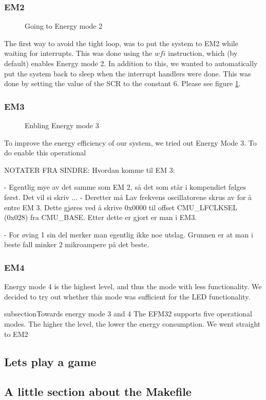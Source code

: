 	\subsubsection{EM2}
	
	\begin{figure}[h]
		
		\caption{Going to Energy mode 2}
		\label{code:wfi_scr}
	\end{figure}
	
	The first way to avoid the tight loop, was to put the system to EM2 while waiting for interrupts. This was done using the $wfi$ instruction, which (by default) enables Energy mode 2. In addition to this, we wanted to automatically put the system back to sleep when the interrupt handlers were done. This was done by setting the value of the SCR to the constant $6$. Please see figure \ref{code:wfi_scr}.

		\subsubsection{EM3}
		
		\begin{figure}[h]
			
			\caption{Enbling Energy mode 3}
			\label{code:em3}
		\end{figure}

		To improve the energy efficiency of our system, we tried out Energy Mode 3. To do enable this operational 

		NOTATER FRA SINDRE:
Hvordan komme til EM 3:

- Egentlig mye av det samme som EM 2, så det som står i kompendiet følges først. Det vil si skriv ...
- Deretter må Lav frekvens oscillatorene skrus av for å entre EM 3. Dette gjøres ved å skrive 0x0000 til offset CMU\_LFCLKSEL (0x028) fra 
  CMU\_BASE. Etter dette er gjort er man i EM3.

- For øving 1 sin del merker man egentlig ikke noe utslag. Grunnen er at man i beste fall minker 2 mikroampere på det beste.
	
		\subsubsection{EM4}
		Energy mode 4 is the highest level, and thus the mode with less functionality. We decided to try out whether this mode was sufficient for the LED functionality.

	 subsection{Towards energy mode 3 and 4}
	The EFM32 supports five operational modes. The higher the level, the lower the energy consumption. We went straight to EM2
	

	
	\subsection{Lets play a game}

	\subsection{A little section about the Makefile}
